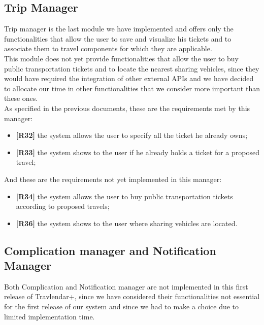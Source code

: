 \subsection{Trip Manager}
Trip manager is the last module we have implemented and offers only the functionalities that allow the user to save and visualize his tickets and to associate them to travel components for which they are applicable. \\
This module does not yet provide functionalities that allow the user to buy public transportation tickets and to locate the nearest sharing vehicles, since they would have required the integration of other external APIs and we have decided to allocate our time in other functionalities that we consider more important than these ones. \\
As specified in the previous documents, these are the requirements met by this manager:
\begin{itemize}
	\item \textbf{[R32]} the system allows the user to specify all the ticket he already owns;
	\item \textbf{[R33]} the system shows to the user if he already holds a ticket for a proposed travel;
\end{itemize}
And these are the requirements not yet implemented in this manager:
\begin{itemize}
	\item \textbf{[R34]} the system allows the user to buy public transportation tickets according to proposed travels;
	\item \textbf{[R36]} the system shows to the user where sharing vehicles are located.
\end{itemize}
\newpage
\subsection{Complication manager and Notification Manager}
Both Complication and Notification manager are not implemented in this first release of Travlendar+, since we have considered their functionalities not essential for the first release of our system and since we had to make a choice due to limited implementation time. 

